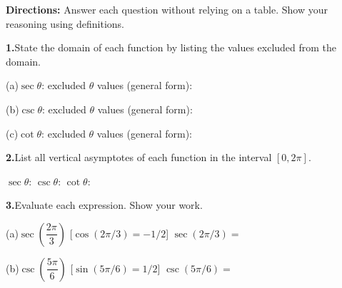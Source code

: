 \documentclass[10pt]{article}
\begin{document}
\vspace{0.08in}

\begin{tcolorbox}[colback=white, colframe=black!40,
    title=\textbf{Tier A --- Apply},
    fonttitle=\bfseries, arc=2mm, left=3mm, right=3mm, top=2mm, bottom=2mm]

\textbf{Directions:} Answer each question without relying on a table. Show
your reasoning using definitions.

\vspace{6pt}
\textbf{1.}\quad State the domain of each function by listing the values excluded
from the domain.

\vspace{4pt}
(a)\quad $\sec\theta$: excluded $\theta$ values (general form):
\underline{\hspace{4.5cm}}

\vspace{4pt}
(b)\quad $\csc\theta$: excluded $\theta$ values (general form):
\underline{\hspace{4.5cm}}

\vspace{4pt}
(c)\quad $\cot\theta$: excluded $\theta$ values (general form):
\underline{\hspace{4.5cm}}

\vspace{8pt}
\textbf{2.}\quad List all vertical asymptotes of each function in the interval $[0, 2\pi]$.

\vspace{4pt}
$\sec\theta$: \underline{\hspace{3.5cm}} \quad
$\csc\theta$: \underline{\hspace{3.5cm}} \quad
$\cot\theta$: \underline{\hspace{3.5cm}}

\vspace{8pt}
\textbf{3.}\quad Evaluate each expression. Show your work.

\vspace{4pt}
(a)\quad $\sec\!\left(\dfrac{2\pi}{3}\right)$
\hspace{0.4cm} [$\cos(2\pi/3) = -1/2$]
\hspace{1cm} $\sec(2\pi/3) = $ \underline{\hspace{2.5cm}}

\vspace{6pt}
(b)\quad $\csc\!\left(\dfrac{5\pi}{6}\right)$
\hspace{0.4cm} [$\sin(5\pi/6) = 1/2$]
\hspace{1cm} $\csc(5\pi/6) = $ \underline{\hspace{2.5cm}}


\end{tcolorbox}
\end{document}

